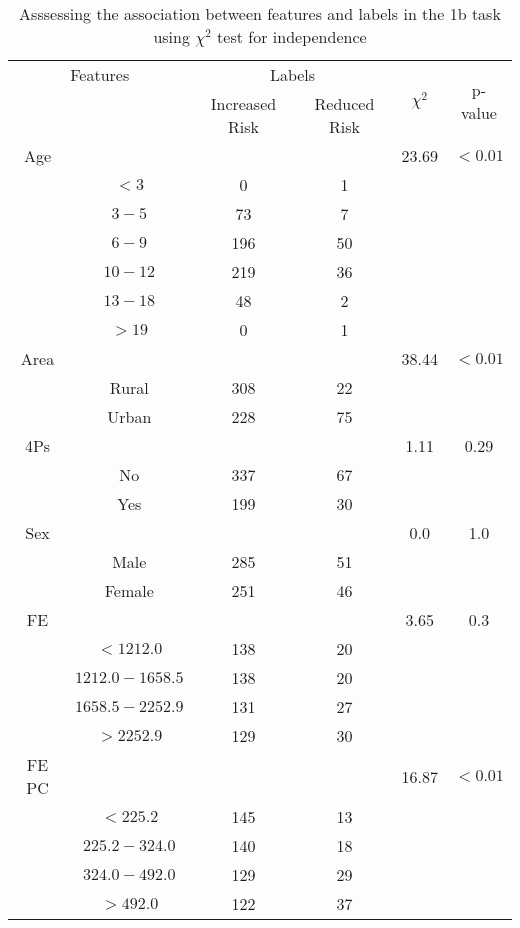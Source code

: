 \begin{table}[!htb]
\centering
\caption{Asssessing the association between features and labels in the 1b task using $\chi^2$ test for independence}
\label{tab:chitest_1b}
\begin{tabular}{c c | c c| c | c}
\hline
\multicolumn{2}{c|}{Features}& \multicolumn{2}{c|}{Labels}& \multirow{2}{*}{$\chi^2$} & \multirow{2}{*}{p-value}\\ 
& & Increased Risk & Reduced Risk & & \\ 
\hline
Age &  &  & & 23.69 & $< 0.01$ \\ 
& $< 3$ & 0 & 1& & \\ 
& $3-5$ & 73 & 7& & \\ 
& $6-9$ & 196 & 50& & \\ 
& $10-12$ & 219 & 36& & \\ 
& $13-18$ & 48 & 2& & \\ 
& $> 19$ & 0 & 1& & \\ 
\hline 
Area &  &  & & 38.44 & $< 0.01$ \\ 
& Rural & 308 & 22& & \\ 
& Urban & 228 & 75& & \\ 
\hline 
4Ps &  &  & & 1.11 & 0.29 \\ 
& No & 337 & 67& & \\ 
& Yes & 199 & 30& & \\ 
\hline 
Sex &  &  & & 0.0 & 1.0 \\ 
& Male & 285 & 51& & \\ 
& Female & 251 & 46& & \\ 
\hline 
FE &  &  & & 3.65 & 0.3 \\ 
& $< 1212.0$ & 138 & 20& & \\ 
& $1212.0-1658.5$ & 138 & 20& & \\ 
& $1658.5-2252.9$ & 131 & 27& & \\ 
& $> 2252.9$ & 129 & 30& & \\ 
\hline 
FE PC &  &  & & 16.87 & $< 0.01$ \\ 
& $< 225.2$ & 145 & 13& & \\ 
& $225.2-324.0$ & 140 & 18& & \\ 
& $324.0-492.0$ & 129 & 29& & \\ 
& $> 492.0$ & 122 & 37& & \\ 
\hline 
\end{tabular}
\end{table}
